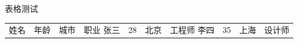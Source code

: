 \documentclass{article}
\begin{document}
表格测试

\begin{tabular}{|c|c|c|c|}
\hline
姓名 & 年龄 & 城市 & 职业
\hline
张三 & 28 & 北京 & 工程师
\hline
李四 & 35 & 上海 & 设计师
\hline
\end{tabular}
\end{document}
